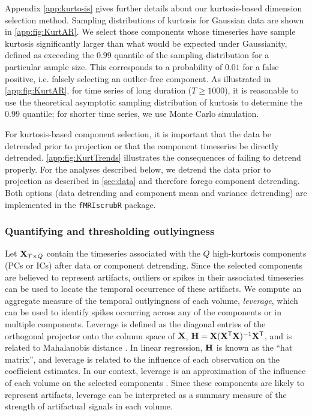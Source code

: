 \documentclass{article}
\newcommand{\R}{\texttt{R}\xspace}
\newcommand{\fMRIscrub}{\texttt{fMRIscrub}\xspace}
\renewcommand{\top}{\mathsf{T}}
\begin{document}
Appendix \ref{app:kurtosis} gives further details about our kurtosis-based dimension selection method. Sampling distributions of kurtosis for Gaussian data are shown in \autoref{app:fig:KurtAR}. We select those components whose timeseries have sample kurtosis significantly larger than what would be expected under Gaussianity, defined as exceeding the $0.99$ quantile of the sampling distribution for a particular sample size. This corresponds to a probability of $0.01$ for a false positive, i.e. falsely selecting an outlier-free component.  As illustrated in \autoref{app:fig:KurtAR}, for time series of long duration ($T\geq 1000$), it is reasonable to use the theoretical asymptotic sampling distribution of kurtosis to determine the $0.99$ quantile; for shorter time series, we use Monte Carlo simulation. 

For kurtosis-based component selection, it is important that the data be detrended prior to projection or that the component timeseries be directly detrended. \autoref{app:fig:KurtTrends} illustrates the consequences of failing to detrend properly. For the analyses described below, we detrend the data prior to projection as described in \autoref{sec:data} and therefore forego component detrending.  Both options (data detrending and component mean and variance detrending) are implemented in the \fMRIscrub \R package.  

\subsubsection{Quantifying and thresholding outlyingness}

Let $\mathbf X_{T\times Q}$ contain the timeseries associated with the $Q$ high-kurtosis components (PCs or ICs) after data or component detrending. Since the selected components are believed to represent artifacts, outliers or spikes in their associated timeseries can be used to locate the temporal occurrence of these artifacts.  We compute an aggregate measure of the temporal outlyingness of each volume, \textit{leverage}, which can be used to identify spikes occurring across any of the components or in multiple components. Leverage is defined as the diagonal entries of the orthogonal projector onto the column space of $\mathbf X$, $\bfH=\bfX(\bfX^\top \bfX)^{-1}\bfX^\top$, and is related to Mahalanobis distance \citep{kutnerAppliedLinearStatistical2005, weinerHandbookPsychologyResearch2012}.  In linear regression, $\mathbf H$ is known as the ``hat matrix'', and leverage is related to the influence of each observation on the coefficient estimates.  In our context, leverage is an approximation of the influence of each volume on the selected components \citep{mejiaPCALeverageOutlier2017}. Since these components are likely to represent artifacts, leverage can be interpreted as a {summary measure of the strength of artifactual signals} in each volume.
\end{document}
